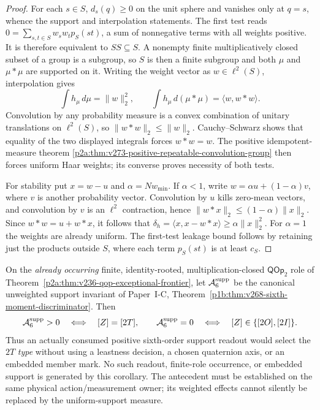 \documentclass[12pt,a4paper]{article}
\begin{document}
\begin{proof}
For each $s\in S$, $d_s(q)\ge0$ on the unit sphere and vanishes
only at $q=s$, whence the support and interpolation statements.
The first test reads
$0=\sum_{s,t\in S}w_sw_t p_S(st)$, a sum of nonnegative terms
with all weights positive. It is therefore equivalent to $SS\subseteq S$.
A nonempty finite multiplicatively closed subset of a group is a
subgroup, so $S$ is then a finite subgroup and both $\mu$ and
$\mu*\mu$ are supported on it.
Writing the weight vector as $w\in\ell^2(S)$, interpolation gives
\[
 \int h_\mu\,d\mu=\|w\|_2^2,\qquad
 \int h_\mu\,d(\mu*\mu)=\langle w,w*w\rangle.
\]
Convolution by any probability measure is a convex combination of
unitary translations on $\ell^2(S)$, so $\|w*w\|_2\le\|w\|_2$.
Cauchy--Schwarz shows that equality of the two displayed integrals
forces $w*w=w$. The positive idempotent-measure theorem
\ref{p2a:thm:v273-positive-repeatable-convolution-group} then forces
uniform Haar weights; its converse proves necessity of both tests.

For stability put $x=w-u$ and $\alpha=Nw_{\min}$. If $\alpha<1$,
write $w=\alpha u+(1-\alpha)v$, where $v$ is another probability
vector. Convolution by $u$ kills zero-mean vectors, and convolution
by $v$ is an $\ell^2$ contraction, hence
$\|w*x\|_2\le(1-\alpha)\|x\|_2$.
Since $w*w=u+w*x$, it follows that
$\delta_h=\langle x,x-w*x\rangle\ge\alpha\|x\|_2^2$.
For $\alpha=1$ the weights are already uniform. The first-test
leakage bound follows by retaining just the products outside $S$,
where each term $p_S(st)$ is at least $c_S$.
\end{proof}

\begin{corollary}
\label{p2a:cor:v268-observable-sixth-moment-2t}
On the \emph{already occurring} finite, identity-rooted,
multiplication-closed $\mathsf{QOp}_2$ role of
Theorem~\ref{p2a:thm:v236-qop-exceptional-frontier}, let
$\mathcal A_6^{\rm supp}$ be the canonical unweighted support
invariant of Paper~I-C,
Theorem~\ref{p1b:thm:v268-sixth-moment-discriminator}.  Then
\[
 \mathcal A_6^{\rm supp}>0
 \quad\Longleftrightarrow\quad
 [Z]=[2T],\qquad
 \mathcal A_6^{\rm supp}=0
 \quad\Longleftrightarrow\quad
 [Z]\in\{[2O],[2I]\}.
\]
Thus an actually consumed positive sixth-order support readout would
select the $2T$ \emph{type} without using a leastness decision, a
chosen quaternion axis, or an embedded member mark.  No such readout,
finite-role occurrence, or embedded support is generated by this
corollary.  The antecedent must be established on the same physical
action/measurement owner; its weighted effects cannot silently be
replaced by the uniform-support measure.
\end{corollary}
\end{document}
